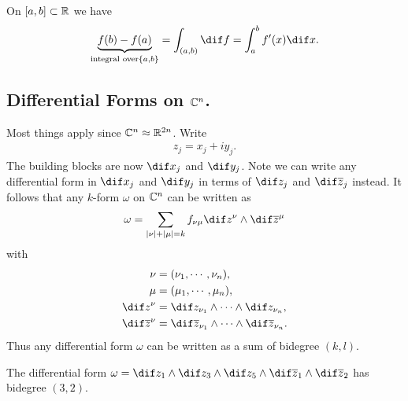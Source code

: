 \begin{example}
    On $[a,b] \subset \mathbb{R}$ we have
    \begin{align*}
        \underbrace{f(b) - f(a)}_{\text{integral over} \{a,b\} } = \int_{(a,b)} \dif f = \int_a^b f'(x) \dif x.
    \end{align*}
\end{example}

\subsection{Differential Forms on $\mathbb{C}^n$.}

Most things apply since $\mathbb{C}^n \approx \mathbb{R}^{2n}$. Write
\begin{align*}
    z_j = x_j + i y_j.
\end{align*}
The building blocks are now $\dif x_j$ and $\dif y_j$. Note we can write any differential form in $\dif x_j$ and $\dif y_j$ in terms of $\dif z_j$ and $\dif \zz_j$ instead. It follows that any $k$-form $\omega$ on $\mathbb{C}^n$ can be written as
\begin{align*}
    \omega = \sum_{|\nu| + |\mu| = k} f_{\nu \mu} \dif z^\nu \wedge \dif \zz^\mu
\end{align*}
with
\begin{align*}
    \nu &= (\nu_1 , \cdots , \nu_n),\\
    \mu &= (\mu_1 , \cdots , \mu_n),\\
    \dif z^\nu &= \dif z_{\nu_1} \wedge \cdots \wedge \dif z_{\nu_n},\\
    \dif \zz^\nu &= \dif \zz_{\nu_1} \wedge \cdots \wedge \dif \zz_{\nu_n}.\\
\end{align*}
Thus any differential form $\omega$ can be written as a sum of bidegree $(k,l)$.

\begin{example}
    The differential form $\omega = \dif z_1 \wedge \dif z_3 \wedge \dif z_5 \wedge \dif \zz_1 \wedge \dif \zz_2 $ has bidegree $(3,2)$.
\end{example}

